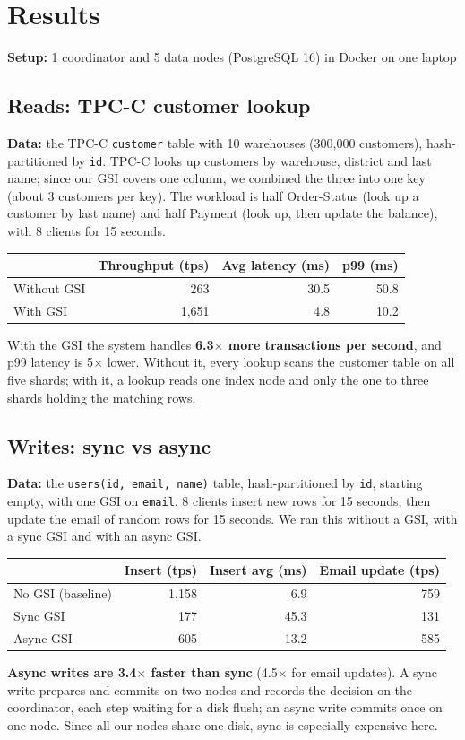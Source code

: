 \documentclass[11pt,a4paper]{article}
\begin{document}
\section{Results}\label{sec:results}
\textbf{Setup:} 1 coordinator and 5 data nodes (PostgreSQL 16) in Docker on one laptop

\subsection{Reads: TPC-C customer lookup}
\textbf{Data:} the TPC-C \texttt{customer} table with 10 warehouses (300,000 customers), hash-partitioned
by \texttt{id}. TPC-C looks up customers by warehouse, district and last name; since our GSI covers one
column, we combined the three into one key (about 3 customers per key). The workload is half
Order-Status (look up a customer by last name) and half Payment (look up, then update the balance), with
8 clients for 15 seconds.

\begin{center}
\begin{tabular}{lrrr}
\toprule
 & Throughput (tps) & Avg latency (ms) & p99 (ms) \\
\midrule
Without GSI & 263   & 30.5 & 50.8 \\
With GSI    & 1,651 & 4.8  & 10.2 \\
\bottomrule
\end{tabular}
\end{center}
With the GSI the system handles \textbf{6.3$\times$ more transactions per second}, and p99 latency is
5$\times$ lower. Without it, every lookup scans the customer table on all five shards; with it, a lookup
reads one index node and only the one to three shards holding the matching rows.

\subsection{Writes: sync vs async}
\textbf{Data:} the \texttt{users(id, email, name)} table, hash-partitioned by \texttt{id}, starting empty,
with one GSI on \texttt{email}. 8 clients insert new rows for 15 seconds, then update the email of random
rows for 15 seconds. We ran this without a GSI, with a sync GSI and with an async GSI.

\begin{center}
\begin{tabular}{lrrr}
\toprule
 & Insert (tps) & Insert avg (ms) & Email update (tps) \\
\midrule
No GSI (baseline) & 1,158 & 6.9  & 759 \\
Sync GSI          & 177   & 45.3 & 131 \\
Async GSI         & 605   & 13.2 & 585 \\
\bottomrule
\end{tabular}
\end{center}
\textbf{Async writes are 3.4$\times$ faster than sync} (4.5$\times$ for email updates). A sync write
prepares and commits on two nodes and records the decision on the coordinator, each step waiting for a
disk flush; an async write commits once on one node. Since all our nodes share one disk, sync is
especially expensive here.
\end{document}

